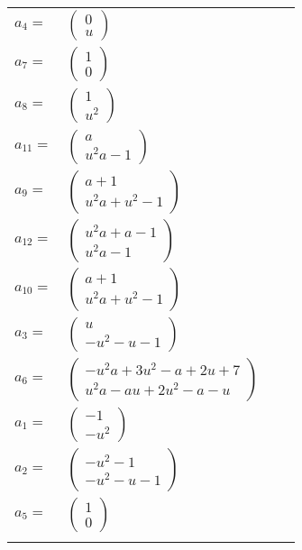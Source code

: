 \documentclass[1p]{elsarticle_modified}
\theoremstyle{definition}
\begin{document}
\begin{tabular}{m{7pt} m{180pt} m{7pt} m{180pt} }
\flushright $a_{4}=$&$\begin{pmatrix}0\\u\end{pmatrix}$ \\
\flushright $a_{7}=$&$\begin{pmatrix}1\\0\end{pmatrix}$ \\
\flushright $a_{8}=$&$\begin{pmatrix}1\\u^2\end{pmatrix}$ \\
\flushright $a_{11}=$&$\begin{pmatrix}a\\u^2 a-1\end{pmatrix}$ \\
\flushright $a_{9}=$&$\begin{pmatrix}a+1\\u^2 a+u^2-1\end{pmatrix}$ \\
\flushright $a_{12}=$&$\begin{pmatrix}u^2 a+a-1\\u^2 a-1\end{pmatrix}$ \\
\flushright $a_{10}=$&$\begin{pmatrix}a+1\\u^2 a+u^2-1\end{pmatrix}$ \\
\flushright $a_{3}=$&$\begin{pmatrix}u\\- u^2- u-1\end{pmatrix}$ \\
\flushright $a_{6}=$&$\begin{pmatrix}- u^2 a+3 u^2- a+2 u+7\\u^2 a- a u+2 u^2- a- u\end{pmatrix}$ \\
\flushright $a_{1}=$&$\begin{pmatrix}-1\\- u^2\end{pmatrix}$ \\
\flushright $a_{2}=$&$\begin{pmatrix}- u^2-1\\- u^2- u-1\end{pmatrix}$ \\
\flushright $a_{5}=$&$\begin{pmatrix}1\\0\end{pmatrix}$\\&\end{tabular}
\end{document}
